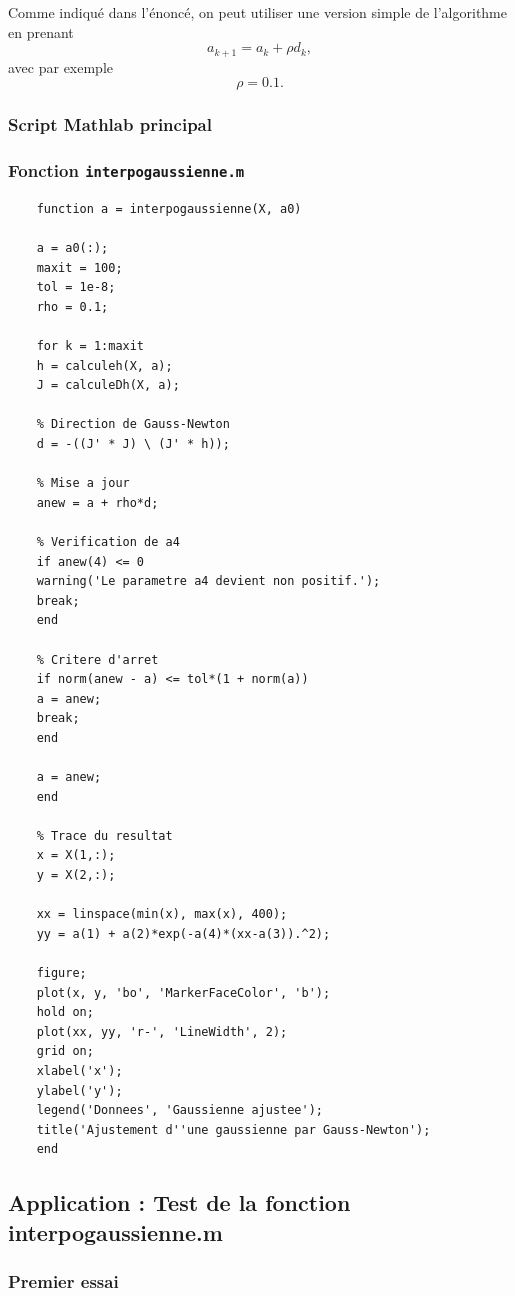 \documentclass[a4paper,12pt]{article}
\begin{document}
	Comme indiqué dans l'énoncé, on peut utiliser une version simple de l'algorithme en prenant
	\begin{equation}
	a_{k+1}=a_k+\rho d_k,
	\end{equation}
	avec par exemple
	\[
	\rho=0.1.
	\]
	
	\subsubsection{Script Mathlab principal}
	
	\subsubsection*{Fonction \texttt{interpogaussienne.m}}
	
	\begin{verbatim}
	function a = interpogaussienne(X, a0)
	
	a = a0(:);
	maxit = 100;
	tol = 1e-8;
	rho = 0.1;
	
	for k = 1:maxit
	h = calculeh(X, a);
	J = calculeDh(X, a);
	
	% Direction de Gauss-Newton
	d = -((J' * J) \ (J' * h));
	
	% Mise a jour
	anew = a + rho*d;
	
	% Verification de a4
	if anew(4) <= 0
	warning('Le parametre a4 devient non positif.');
	break;
	end
	
	% Critere d'arret
	if norm(anew - a) <= tol*(1 + norm(a))
	a = anew;
	break;
	end
	
	a = anew;
	end
	
	% Trace du resultat
	x = X(1,:);
	y = X(2,:);
	
	xx = linspace(min(x), max(x), 400);
	yy = a(1) + a(2)*exp(-a(4)*(xx-a(3)).^2);
	
	figure;
	plot(x, y, 'bo', 'MarkerFaceColor', 'b');
	hold on;
	plot(xx, yy, 'r-', 'LineWidth', 2);
	grid on;
	xlabel('x');
	ylabel('y');
	legend('Donnees', 'Gaussienne ajustee');
	title('Ajustement d''une gaussienne par Gauss-Newton');
	end
	\end{verbatim}
	
	\subsection{Application : Test de la fonction interpogaussienne.m}
	
	\subsubsection*{Premier essai}
	
\end{document}
